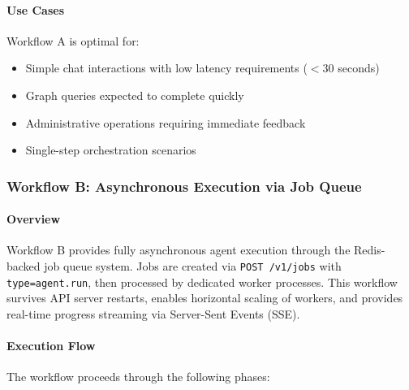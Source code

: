 \paragraph{Use Cases} Workflow A is optimal for:
\begin{itemize}
    \item Simple chat interactions with low latency requirements ($< 30$ seconds)
    \item Graph queries expected to complete quickly
    \item Administrative operations requiring immediate feedback
    \item Single-step orchestration scenarios
\end{itemize}

\subsubsection{Workflow B: Asynchronous Execution via Job Queue}
\label{subsubsec:workflow-b}

\paragraph{Overview} Workflow B provides fully asynchronous agent execution through the Redis-backed job queue system. Jobs are created via \texttt{POST /v1/jobs} with \texttt{type=agent.run}, then processed by dedicated worker processes. This workflow survives API server restarts, enables horizontal scaling of workers, and provides real-time progress streaming via Server-Sent Events (SSE).

\paragraph{Execution Flow} The workflow proceeds through the following phases:

